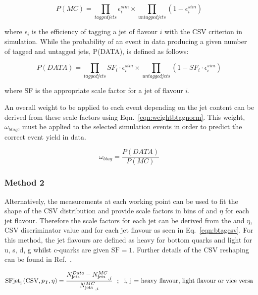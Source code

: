 \begin{centering}
\begin{equation}
P(MC) = \prod_{tagged jets}\epsilon^{sim}_{i} \times \prod_{untagged jets}(1- \epsilon^{sim}_{i})
\end{equation}
\end{centering}
where $\epsilon_{i}$ is the efficiency of tagging a jet of flavour $i$ with the CSV criterion in simulation. While the probability of an event in data producing a given number of tagged and untagged jets, P(DATA), is defined as follows:


\begin{centering}
\begin{equation}
P(DATA) = \prod_{tagged jets}SF_{i}\cdot\epsilon^{sim}_{i} \times \prod_{untagged jets}(1- SF_{i}\cdot\epsilon^{sim}_{i})
\end{equation}
\end{centering}
where SF is the appropriate scale factor for a jet of flavour $i$. 

An overall weight to be applied to each event depending on the jet content can be derived from these scale factors using Eqn.~\ref{eqn:weightbtagnorm}. This weight, $\omega_{btag}$, must be applied to the selected simulation events in order to predict the correct event yield in data.

\begin{centering}
\begin{equation}
 \omega_{btag} = \frac{P(DATA)}{P(MC)}
 \label{eqn:weightbtagnorm}
\end{equation}
\end{centering}

\subsubsection{Method 2 ~\label{subsec:method2btag}}

Alternatively, the measurements at each working point can be used to fit the shape of the CSV distribution and provide scale factors in bins of \pt and $\eta$ for each jet flavour. Therefore the scale factors for each jet can be derived from the \pt and $\eta$, CSV discriminator value and for each jet flavour as seen in Eq.~\ref{eqn:btagcsv}. For this method, the jet flavours are defined as heavy for bottom quarks and light for u, s, d, g whilst c-quarks are given $\textrm{SF} = 1$. Further details of the CSV reshaping can be found in Ref.~\cite{CMS-NOTE-2013-130}.

\begin{equation}
\textrm{SFjet}_{\textrm{i}} \left(\textrm{CSV},p_{\mathrm{T}},\eta \right) = \frac{N_{\textrm{jets}}^{Data} - {N_{\textrm{jets}}^{MC}}_{,j}}{{N_{\textrm{jets}}^{MC}}_{,i}} ~~;~~ \textrm{i, j = heavy flavour, light flavour or vice versa}\label{eqn:btagcsv}
\end{equation}

